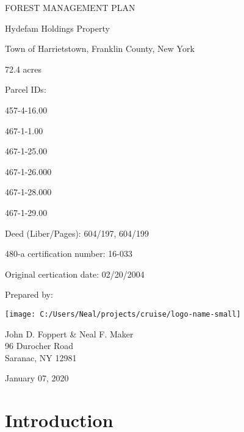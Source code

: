 \documentclass[]{tufte-handout}
\date{}
\begin{document}
 \vspace*{30pt}

\huge FOREST MANAGEMENT PLAN

\vspace{30pt}

\LARGE Hydefam Holdings Property

\vspace{22pt}

\normalsize Town of Harrietstown, Franklin County, New York

\vspace{70pt}

\small 72.4 acres

\vspace{18pt}

Parcel IDs:

\vspace{8pt}

457-4-16.00

467-1-1.00

467-1-25.00

467-1-26.000

467-1-28.000

467-1-29.00

\vspace{10pt}

Deed (Liber/Pages): 604/197, 604/199

\vspace{10pt}

480-a certification number: 16-033

\vspace{10pt}

Original certication date: 02/20/2004

\vspace{60pt}

Prepared by:

\texttt{[image: C:/Users/Neal/projects/cruise/logo-name-small]}

John D. Foppert \& Neal F. Maker\\
96 Durocher Road\\
Saranac, NY 12981

\vspace{30pt}

\large January 07, 2020

\pagebreak
{}

\section{Introduction}\label{introduction}
\end{document}
